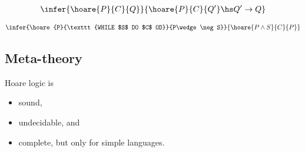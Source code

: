 \documentclass{article}
\begin{document}
\begin{definition}
    \begin{align*}
        \infer{\hoare{P}{C}{Q}}{\hoare{P}{C}{Q'}\hs Q'\to Q}
    \end{align*} 
\end{definition}

\begin{definition}
    \begin{align*}
        \infer{\hoare{P}{\texttt{WHILE $S$ DO $C$ OD}}{P\wedge\neg S}}{\hoare{P\wedge S}{C}{P}}
    \end{align*} 
\end{definition}

\subsection{Meta-theory}

\begin{theorem}
    Hoare logic is 
    \begin{itemize}
        \item sound,
        \item undecidable, and 
        \item complete, but only for simple languages.
    \end{itemize}
\end{theorem}
\end{document}
